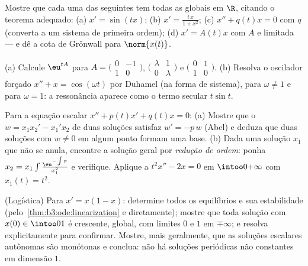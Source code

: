 \begin{exercise}[$\star\star$]\label{exo:b3:ode:3}
Mostre que cada uma das seguintes tem todas as  globais
em $\R$, citando o teorema adequado:
(a) $x' = \sin(tx)$;
(b) $x' = \frac{t\,x}{1 + x^2}$;
(c) $x'' + q(t)x = 0$ com $q$  (converta a um sistema de primeira
ordem);
(d) $x' = A(t)x$ com $A$  e limitada --- e dê a cota de Grönwall
para $\norm{x(t)}$.
\end{exercise}

\begin{exercise}[$\star\star$]\label{exo:b3:ode:4}
(a) Calcule $\eu^{tA}$ para $A = \bigl(\begin{smallmatrix}0 & -1\\ 1 &
0\end{smallmatrix}\bigr)$, $\bigl(\begin{smallmatrix}\lambda & 1\\ 0 &
\lambda\end{smallmatrix}\bigr)$ e $\bigl(\begin{smallmatrix}0 & 1\\ 1 &
0\end{smallmatrix}\bigr)$.
(b) Resolva o oscilador forçado $x'' + x = \cos(\omega t)$ por Duhamel (na forma de
sistema), para $\omega \neq 1$ e para $\omega =
1$: a ressonância aparece como o termo
secular $t\sin t$.
\end{exercise}

\begin{exercise}[$\star\star$]\label{exo:b3:ode:5}
Para a equação escalar $x'' + p(t)x' + q(t)x = 0$:
(a) Mostre que o  $w = x_1x_2' - x_1'x_2$ de duas soluções satisfaz $w' = -p\,w$
(Abel) e deduza que duas soluções com $w \neq 0$ em algum ponto formam uma
base.
(b) Dada uma solução $x_1$ que não se anula, encontre a solução
geral por \emph{redução de ordem}: ponha $x_2 = x_1\int
\frac{\eu^{-\int p}}{x_1^2}$ e verifique. Aplique a
$t^2x'' -
2x = 0$ em $\intoo0{+\infty}$ com $x_1(t) = t^2$.
\end{exercise}

\begin{exercise}[$\star\star$]\label{exo:b3:ode:6}
(Logística) Para $x' = x(1 - x)$: determine todos os equilíbrios e sua
estabilidade (pelo~\cref{thm:b3:ode:linearization} e diretamente); mostre que toda
solução com $x(0) \in \intoo01$ é crescente, global, com limites $0$ e $1$ em
$\mp\infty$; e resolva explicitamente para confirmar. Mostre, mais
geralmente, que as soluções escalares autônomas são monótonas e conclua:
não há soluções periódicas não constantes em dimensão $1$.
\end{exercise}

